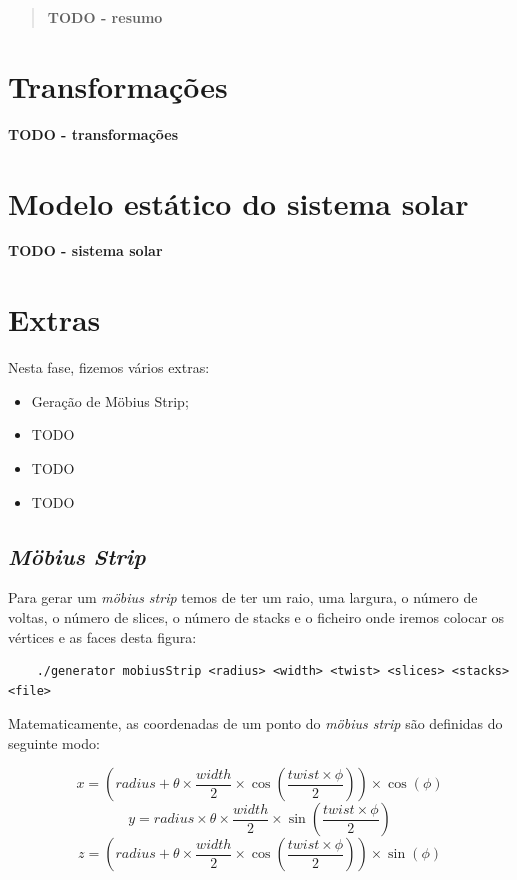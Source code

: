 \documentclass[12pt, a4paper]{article}
\begin{document}
\pagebreak

\begin{abstract}
    \textbf{\color{red} TODO - resumo}
\end{abstract}

\section{Transformações}

\textbf{\color{red} TODO - transformações}

\section{Modelo estático do sistema solar}

\textbf{\color{red} TODO - sistema solar}

\section{Extras}

Nesta fase, fizemos vários extras:
\begin{itemize}
    \item Geração de Möbius Strip;
    \item \color{red} TODO
    \item \color{red} TODO
    \item \color{red} TODO
\end{itemize}
\subsection{\emph{Möbius Strip}}

Para gerar um \emph{möbius strip} temos de ter um raio, uma largura, o número
de voltas, o número de slices, o número de stacks e o ficheiro onde iremos
colocar os vértices e as faces desta figura:
\begin{verbatim}
    ./generator mobiusStrip <radius> <width> <twist> <slices> <stacks> <file>
\end{verbatim}

Matematicamente, as coordenadas de um ponto do \emph{möbius strip} são definidas do seguinte modo:

$$x = (radius + \theta \times \frac{width}{2} \times \cos (\frac{twist \times \phi}{2})) \times
\cos (\phi)$$
$$y = radius \times \theta \times \frac{width}{2} \times \sin (\frac{twist \times \phi}{2})$$
$$z = (radius + \theta \times \frac{width}{2} \times \cos (\frac{twist \times \phi}{2})) \times
\sin (\phi)$$
\end{document}
